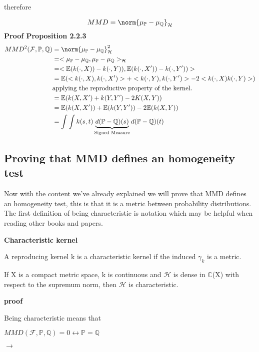 therefore

$$MMD = \norm{\mu_{\mathbb{P}}- \mu_{\mathbb{Q}}}_{\mathcal{H}}$$
\newpage
\textbf{Proof Proposition 2.2.3}
\begin{equation}{}
\begin{split}
	MMD^{2}(\mathcal{F},\mathbb{P},\mathbb{Q}) 
& = \norm{\mu_{\mathbb{P}}- \mu_{\mathbb{Q}}}_{\mathcal{H}}^{2} \\
& =<\mu_{\mathbb{P}}- \mu_{\mathbb{Q}},\mu_{\mathbb{P}}- \mu_{\mathbb{Q}}>_{\mathcal{H}}\\
&=<\mathbb{E}(k(\cdot,X))-k(\cdot,Y)),\mathbb{E}(k(\cdot,X'))-k(\cdot,Y'))>\\
&=\mathbb{E}(<k(\cdot,X),k(\cdot,X')> + <k(\cdot,Y),k(\cdot,Y')> - 2<k(\cdot,X)k(\cdot,Y)>)\\
&\text{applying the reproductive property of the kernel.}\\
&=\mathbb{E}(k(X,X') + k(Y,Y') -2K(X,Y)) \\
&= \mathbb{E}(k(X,X')) + \mathbb{E}(k(Y,Y')) -2\mathbb{E}(k(X,Y))\\
&= \int\int k(s,t) \underbrace{d(\mathbb{P}-\mathbb{Q})(s)}_{\text{Signed Measure}} d(\mathbb{P}-\mathbb{Q})(t)
\end{split}
\end{equation}
\newpage
\subsection{Proving that MMD defines an homogeneity test \label{P:HTMMD}}

Now with the content we've already explained we will prove that MMD defines an homogeneity test, this is that it is a metric between probability distributions. The first definition of being characteristic is notation which may be helpful when reading other books and papers. 
\begin{defn}
\textsf{\textbf{Characteristic kernel}}

A reproducing kernel k is a characteristic kernel if the induced $\gamma_{k}$ is a metric.
\end{defn}
\begin{thm}

If X is a compact metric space, k is continuous and $\mathcal{H}$ is dense in $\mathbb{C}$(X) with respect to the supremum norm, then $\mathcal{H}$ is characteristic.
\end{thm}
\textbf{proof}


Being characteristic means that 

$MMD(\mathcal{F},\mathbb{P},\mathbb{Q}) = 0 \leftrightarrow \mathbb{P} = \mathbb{Q}$
\begin{flushleft}
$\rightarrow$
\end{flushleft}

